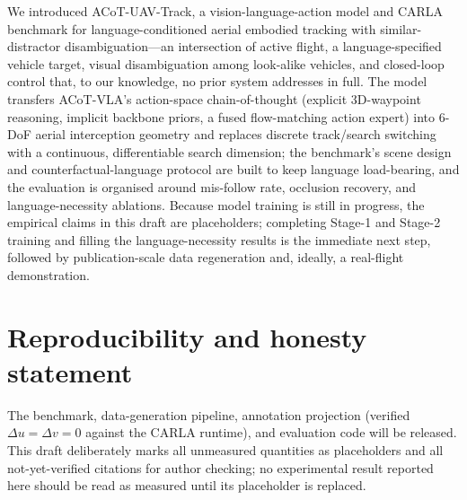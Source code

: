 \documentclass[11pt]{article}
\newcommand{\sys}{ACoT-UAV-Track}
\begin{document}
We introduced \sys{}, a vision-language-action model and CARLA benchmark for
language-conditioned aerial embodied tracking with similar-distractor
disambiguation---an intersection of active flight, a language-specified
vehicle target, visual disambiguation among look-alike vehicles, and
closed-loop control that, to our knowledge, no prior system addresses in
full. The model transfers ACoT-VLA's action-space chain-of-thought (explicit
3D-waypoint reasoning, implicit backbone priors, a fused flow-matching action
expert) into 6-DoF aerial interception geometry and replaces discrete
track/search switching with a continuous, differentiable search dimension;
the benchmark's scene design and counterfactual-language protocol are built
to keep language load-bearing, and the evaluation is organised around
mis-follow rate, occlusion recovery, and language-necessity ablations.
Because model training is still in progress, the empirical claims in this
draft are placeholders; completing Stage-1 and Stage-2 training and filling
the language-necessity results is the immediate next step, followed by
publication-scale data regeneration and, ideally, a real-flight
demonstration.

\section*{Reproducibility and honesty statement}
The benchmark, data-generation pipeline, annotation projection (verified
$\Delta u{=}\Delta v{=}0$ against the CARLA runtime), and evaluation code
will be released. This draft deliberately marks all unmeasured quantities as
placeholders and all not-yet-verified citations for author checking; no
experimental result reported here should be read as measured until its
placeholder is replaced.



\end{document}
